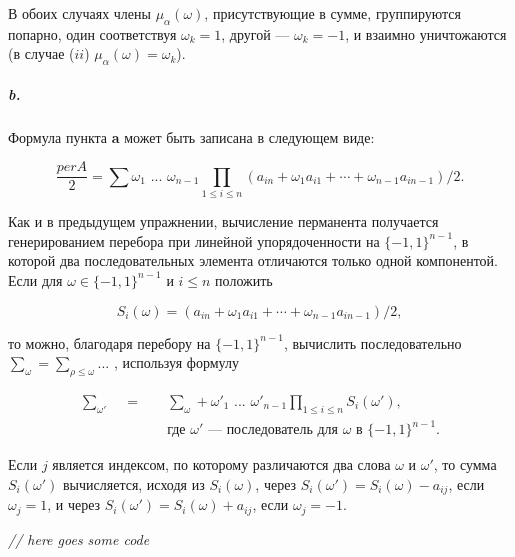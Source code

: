 \documentclass{../../template/mai_book}
\begin{document}
В обоих случаях члены $\mu_\alpha(\omega)$, присутствующие в сумме, группируются попарно, один соответствуя $\omega_k = 1$, другой — $\omega_k = -1$, и взаимно уничтожаются (в случае ($ii$) $\mu_\alpha(\omega) = \omega_k$).

\subparagraph{b.} Формула пункта \textbf{a} может быть записана в следующем виде:

\begin{equation*}
\frac{per A}{2} = \sum \omega_1 \text{ ... } \omega_{n - 1} \prod_{1 \leqslant i \leqslant n} (a_{in} + \omega_1 a_{i1} + \cdots + \omega_{n - 1} a_{in - 1})/2.
\end{equation*}

\noindent
Как и в предыдущем упражнении, вычисление перманента получается генерированием перебора при линейной упорядоченности на $\{-1, 1\}^{n - 1}$, в которой два последовательных элемента отличаются только одной компонентой. Если для $\omega \in \{-1, 1\}^{n - 1}$ и $i \leqslant n$ положить

\begin{equation*}
S_i(\omega) = (a_{in} + \omega_1 a_{i1} + \cdots + \omega_{n - 1} a_{in - 1})/2,
\end{equation*}

\newpage


\noindent
то можно, благодаря перебору на $\{-1, 1\}^{n - 1}$, вычислить последовательно ${\sum}_\omega = {\sum}_{\rho \leqslant \omega}$... , используя формулу

\begin{equation}
	\begin{split}
	{\sum}_{\omega'} \quad = \quad &{\sum}_\omega + {\omega'}_1 \text{ ... } {\omega'}_{n - 1} \prod_{1 \leqslant i \leqslant n} S_i(\omega'),
	\\
	&\text{где } \omega' \text{ — последователь для } \omega \text{ в } \{-1, 1\}^{n - 1}.
	\end{split}
\end{equation}

\noindent
Если $j$ является индексом, по которому различаются два слова $\omega$ и $\omega'$, то сумма $S_i(\omega')$ вычисляется, исходя из $S_i(\omega)$, через $S_i(\omega') = S_i(\omega) - a_{ij}$, если $\omega_j = 1$, и через $S_i(\omega') = S_i(\omega) + a_{ij}$, если $\omega_j = -1$. \newline

\textit{// here goes some code}
\end{document}
